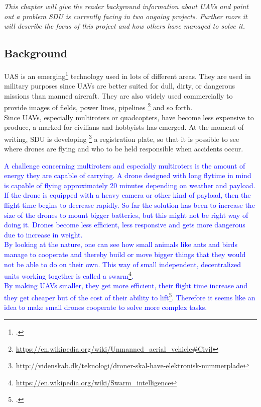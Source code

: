 \textit{This chapter will give the reader background information about UAVs and point out a problem SDU is currently facing in two ongoing projects. Further more it will describe the focus of this project and how others have managed to solve it.}

\subsection*{Background}
UAS is an emerging\footcite{gupta2013review} technology used in lots of different areas. They are used in military purposes since UAVs are better suited for dull, dirty, or dangerous missions than manned aircraft. They are also widely used commercially to provide images of fields, power lines, pipelines \footnote{\url{https://en.wikipedia.org/wiki/Unmanned\_aerial\_vehicle\#Civil}} and so forth.\\
Since UAVs, especially multiroters or quadcopters, have become less expensive to produce, a marked for civilians and hobbyists has emerged. At the moment of writing, SDU is developing \footnote{\url{http://videnskab.dk/teknologi/droner-skal-have-elektronisk-nummerplade}} a registration plate, so that it is possible to see where drones are flying and who to be held responsible when accidents occur.

\textcolor{blue}{A challenge concerning multiroters and especially multiroters is the amount of energy they are capable of carrying. A drone designed with long flytime in mind is capable of flying approximately 20 minutes depending on weather and payload. If the drone is equipped with a heavy camera or other kind of payload, then the flight time begins to decrease rapidly. So far the solution has been to increase the size of the drones to mount bigger batteries, but this might not be right way of doing it. Drones become less efficient, less responsive and gets more dangerous due to increase in weight.\\
By looking at the nature, one can see how small animals like ants and birds manage to cooperate and thereby build or move bigger things that they would not be able to do on their own. This way of small independent, decentralized units working together is called a swarm\footnote{\url{https://en.wikipedia.org/wiki/Swarm\_intelligence}}.\\
By making UAVs smaller, they get more efficient, their flight time increase and they get cheaper but of the cost of their ability to lift\footcite{1_kumar_2016}. Therefore it seems like an idea to make small drones cooperate to solve more complex tasks.} \\

